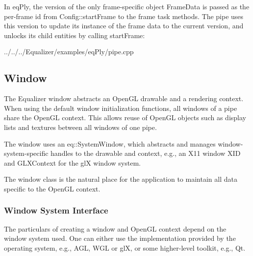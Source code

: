 \documentclass[10pt,a4]{scrartcl}
\begin{document}
In \textsf{eqPly}, the version of the only frame-specific object
\textsf{FrameData} is passed as the per-frame id from
\textsf{Config::startFrame} to the frame task methods. The pipe uses
this version to update its instance of the frame data to the current
version, and unlocks its child entities by calling
\textsf{startFrame}:

{\footnotesize
  {../../../Equalizer/examples/eqPly/pipe.cpp}}


\subsection{\label{sEqplyWIndow}Window}

The Equalizer window abstracts an OpenGL drawable and a rendering
context. When using the default window initialization functions, all
windows of a pipe share the OpenGL context. This allows reuse of OpenGL
objects such as display lists and textures between all windows of one
pipe.

The window uses an \textsf{eq::SystemWindow}, which abstracts and manages
window-system-specific handles to the drawable and context, e.g., an X11 window
\textsf{XID} and \textsf{GLXContext} for the glX window system.

The window class is the natural place for the application to maintain
all data specific to the OpenGL context.

\subsubsection{Window System Interface}

The particulars of creating a window and OpenGL context depend on the
window system used. One can either use the implementation provided by
the operating system, e.g., AGL, WGL or glX, or some higher-level
toolkit, e.g., Qt.
\end{document}
